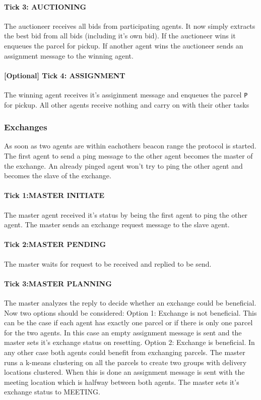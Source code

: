 \documentclass[../main.tex]{subfiles}
\begin{document}
\paragraph{Tick 3: AUCTIONING}
The auctioneer receives all bids from participating agents.
It now simply extracts the best bid from all bids (including it's own bid).
If the auctioneer wins it enqueues the parcel for pickup. 
If another agent wins the auctioneer sends an assignment message to the winning agent.
\paragraph{[Optional] Tick 4: ASSIGNMENT}
The winning agent receives it's assiginment message and enqueues the parcel \texttt{P} for pickup.
All other agents receive nothing and carry on with their other tasks 

\subsubsection{Exchanges}
As soon as two agents are within eachothers beacon range the protocol is started.
The first agent to send a ping message to the other agent becomes the master of the exchange.
An already pinged agent won't try to ping the other agent and becomes the slave of the exchange.

\paragraph{Tick 1:MASTER INITIATE}
The master agent received it's status by being the first agent to ping the other agent.
The master sends an exchange request message to the slave agent. 
\paragraph{Tick 2:MASTER PENDING}
The master waits for request to be received and replied to be send.
\paragraph{Tick 3:MASTER PLANNING}
The master analyzes the reply to decide whether an exchange could be beneficial.
Now two options should be considered:
Option 1: Exchange is not beneficial.
This can be the case if each agent has exactly one parcel or if there is only one parcel for the two agents. 
In this case an empty assignment message is sent and the master sets it's exchange status on resetting.
Option 2: Exchange is beneficial.
In any other case both agents could benefit from exchanging parcels.
The master runs a k-means clustering on all the parcels to create two groups with delivery locations clustered.
When this is done an assignment message is sent with the meeting location which is halfway between both agents.
The master sets it's exchange status to MEETING.
\end{document}
